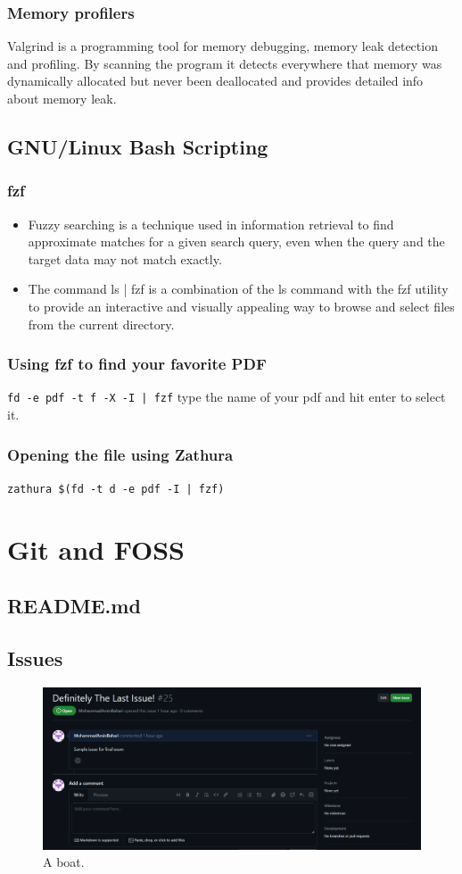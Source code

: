 \documentclass[titlepage]{article}
\begin{document}
\subsubsection{Memory profilers}
Valgrind is a programming tool for memory debugging, memory leak detection and profiling.
By scanning the program it detects everywhere that memory was dynamically allocated but never been deallocated and provides detailed info about memory leak.

\subsection{GNU/Linux Bash Scripting}
\subsubsection{fzf}
\begin{itemize}
    \item Fuzzy searching is a technique used in information retrieval to find approximate matches for a given search query, even when the query and the target data may not match exactly.
    \item The command ls | fzf is a combination of the ls command with the fzf utility to provide an interactive and visually appealing way to browse and select files from the current directory.
\end{itemize}

\subsubsection{ Using fzf to find your favorite PDF}
\texttt{fd -e pdf -t f -X -I | fzf}
type the name of your pdf and hit enter to select it.

\subsubsection{Opening the file using Zathura}
\texttt{zathura \$(fd -t d -e pdf -I | fzf)}




\section{Git and FOSS}
\subsection{README.md}
\subsection{Issues}
\begin{figure}
  \includegraphics[width=\linewidth]{Capture.PNG}
  \caption{A boat.}
  \label{fig:boat1}
\end{figure}
\end{document}
